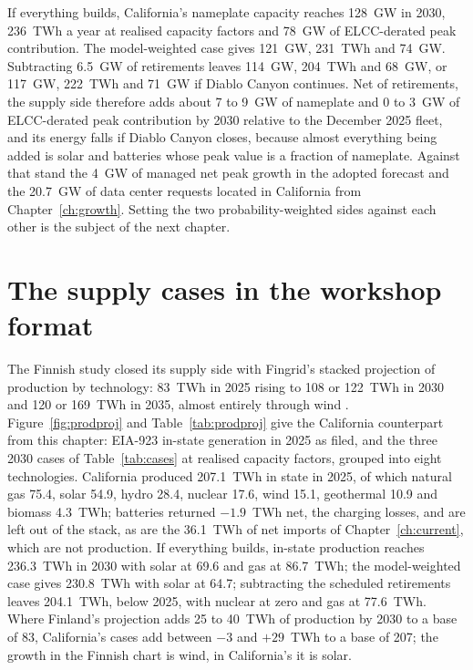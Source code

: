 \begin{table}[H]
\centering\footnotesize
\caption{Planned supply for 2030 in three cases: capacity by technology (MW), energy at realised capacity factors and ELCC-derated peak contribution.}
\label{tab:cases}
\resizebox{\textwidth}{!}{}
\end{table}

If everything builds, California's nameplate capacity reaches 128~GW in 2030, 236~TWh a year at realised capacity factors and 78~GW of ELCC-derated peak contribution. The model-weighted case gives 121~GW, 231~TWh and 74~GW. Subtracting 6.5~GW of retirements leaves 114~GW, 204~TWh and 68~GW, or 117~GW, 222~TWh and 71~GW if Diablo Canyon continues. Net of retirements, the supply side therefore adds about 7 to 9~GW of nameplate and 0 to 3~GW of ELCC-derated peak contribution by 2030 relative to the December 2025 fleet, and its energy falls if Diablo Canyon closes, because almost everything being added is solar and batteries whose peak value is a fraction of nameplate. Against that stand the 4~GW of managed net peak growth in the adopted forecast and the 20.7~GW of data center requests located in California from Chapter~\ref{ch:growth}. Setting the two probability-weighted sides against each other is the subject of the next chapter.

\section{The supply cases in the workshop format}
\label{sec:prodproj}

The Finnish study closed its supply side with Fingrid's stacked projection of production by technology: 83~TWh in 2025 rising to 108 or 122~TWh in 2030 and 120 or 169~TWh in 2035, almost entirely through wind \citep{manner2026}. Figure~\ref{fig:prodproj} and Table~\ref{tab:prodproj} give the California counterpart from this chapter: EIA-923 in-state generation in 2025 as filed, and the three 2030 cases of Table~\ref{tab:cases} at realised capacity factors, grouped into eight technologies. California produced 207.1~TWh in state in 2025, of which natural gas 75.4, solar 54.9, hydro 28.4, nuclear 17.6, wind 15.1, geothermal 10.9 and biomass 4.3~TWh; batteries returned $-1.9$~TWh net, the charging losses, and are left out of the stack, as are the 36.1~TWh of net imports of Chapter~\ref{ch:current}, which are not production. If everything builds, in-state production reaches 236.3~TWh in 2030 with solar at 69.6 and gas at 86.7~TWh; the model-weighted case gives 230.8~TWh with solar at 64.7; subtracting the scheduled retirements leaves 204.1~TWh, below 2025, with nuclear at zero and gas at 77.6~TWh. Where Finland's projection adds 25 to 40~TWh of production by 2030 to a base of 83, California's cases add between $-3$ and $+29$~TWh to a base of 207; the growth in the Finnish chart is wind, in California's it is solar.

